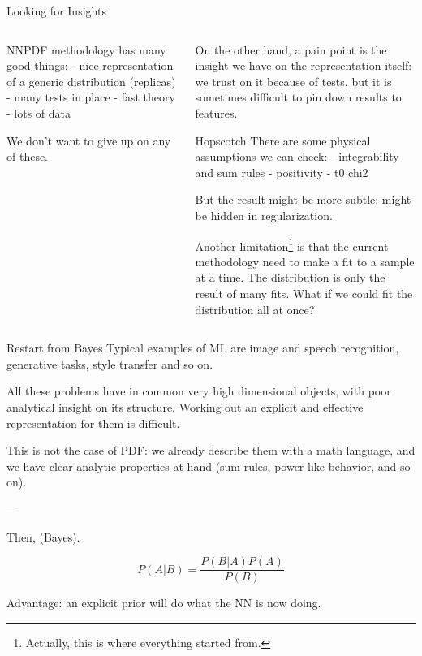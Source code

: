 \documentclass[9pt]{beamer}
\begin{document}
\begin{frame}{Looking for Insights}
    \begin{columns}
        \begin{column}{0.5\textwidth}
            NNPDF methodology has many good things:
            - nice representation of a generic distribution (replicas)
            - many tests in place
            - fast theory
            - lots of data

            We don't want to give up on any of these.
        \end{column}

        \begin{column}{0.5\textwidth}
            On the other hand, a pain point is the insight we have on the
            representation itself: we trust on it because of tests, but it is sometimes
            difficult to pin down results to features.

            \begin{exampleblock}{Hopscotch}
                There are some physical assumptions we can check:
                - integrability and sum rules
                - positivity
                - t0 chi2

                But the result might be more subtle: might be hidden in regularization.
            \end{exampleblock}

            Another limitation\footnote{Actually, this is where everything started
            from.} is that the current methodology need to make a fit to a sample at a
            time. The distribution is only the result of many fits.
            What if we could fit the distribution all at once?
            \vspace*{20pt}
        \end{column}
    \end{columns}
\end{frame}

\begin{frame}{Restart from Bayes}
    Typical examples of ML are image and speech recognition, generative tasks,
    style transfer and so on.

    All these problems have in common very high dimensional objects, with poor
    analytical insight on its structure. Working out an explicit and effective
    representation for them is difficult.

    This is not the case of PDF: we already describe them with a math language,
    and we have clear analytic properties at hand (sum rules, power-like
    behavior, and so on).
    
    ---

    Then, (Bayes).

    \begin{equation*}
        P(A|B) = \frac{P(B|A) P(A)}{P(B)}
    \end{equation*}
    
    Advantage: an explicit prior will do what the NN is now doing.
\end{frame}
\end{document}
